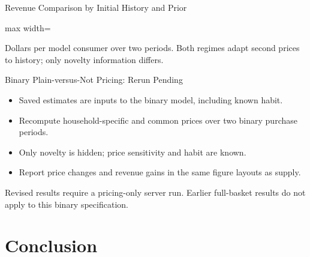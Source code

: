 \documentclass[aspectratio=169,professionalfonts]{beamer}
\newcommand{\shortbuttons}{}
\begin{document}
{\gdef\shortbuttons{}
\begin{frame}[label=short-revised-table]{Revenue Comparison by Initial History and Prior}
  \centering\small
  \begin{adjustbox}{max width=\linewidth}
    
  \end{adjustbox}
  \par\smallskip\footnotesize Dollars per model consumer over two periods.
  Both regimes adapt second prices to history; only novelty information differs.
\end{frame}
}{%
\gdef\shortbuttons{}
\begin{frame}[label=short-revised-pending]{Binary Plain-versus-Not Pricing: Rerun Pending}
  \begin{itemize}
    \item Saved estimates are inputs to the binary model, including known habit.
    \item Recompute household-specific and common prices over two binary purchase periods.
    \item Only novelty is hidden; price sensitivity and habit are known.
    \item Report price changes and revenue gains in the same figure layouts as supply.
  \end{itemize}
  \begin{tcolorbox}
    Revised results require a pricing-only server run.
    Earlier full-basket results do not apply to this binary specification.
  \end{tcolorbox}
\end{frame}
}

















\section{Conclusion}
\end{document}
